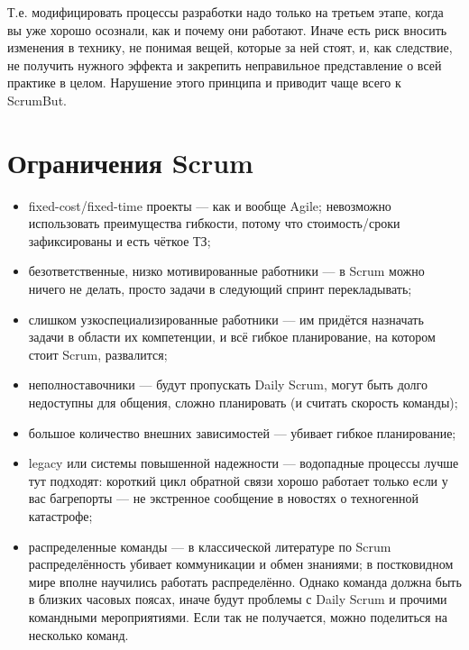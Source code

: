 \documentclass{../../text-style}
\begin{document}
Т.е. модифицировать процессы разработки надо только на третьем этапе, когда вы уже хорошо осознали, как и почему они работают. Иначе есть риск вносить изменения в технику, не понимая вещей, которые за ней стоят, и, как следствие, не получить нужного эффекта и закрепить неправильное представление о всей практике в целом. Нарушение этого принципа и приводит чаще всего к ScrumBut. 

\section{Ограничения Scrum}

\begin{itemize}
    \item fixed-cost/fixed-time проекты --- как и вообще Agile; невозможно использовать преимущества гибкости, потому что стоимость/сроки зафиксированы и есть чёткое ТЗ;
    \item безответственные, низко мотивированные работники --- в Scrum можно ничего не делать, просто задачи в следующий спринт перекладывать;
    \item слишком узкоспециализированные работники --- им придётся назначать задачи в области их компетенции, и всё гибкое планирование, на котором стоит Scrum, развалится;
    \item неполноставочники --- будут пропускать Daily Scrum, могут быть долго недоступны для общения, сложно планировать (и считать скорость команды);
    \item большое количество внешних зависимостей --- убивает гибкое планирование;
    \item legacy или системы повышенной надежности --- водопадные процессы лучше тут подходят: короткий цикл обратной связи хорошо работает только если у вас багрепорты --- не экстренное сообщение в новостях о техногенной катастрофе;
    \item распределенные команды --- в классической литературе по Scrum распределённость убивает коммуникации и обмен знаниями; в постковидном мире вполне научились работать распределённо. Однако команда должна быть в близких часовых поясах, иначе будут проблемы с Daily Scrum и прочими командными мероприятиями. Если так не получается, можно поделиться на несколько команд.
\end{itemize}
\end{document}
